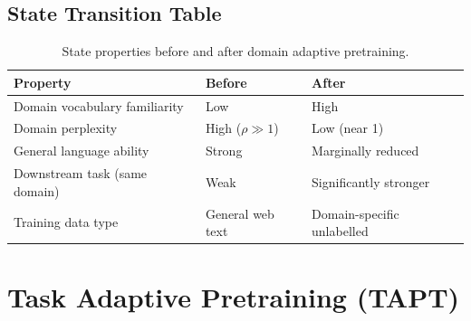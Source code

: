 \subsection{State Transition Table}
\begin{table}[h]\centering
\begin{tabular}{lll}\toprule
\textbf{Property} & \textbf{Before} & \textbf{After}\\\midrule
Domain vocabulary familiarity & Low & High\\
Domain perplexity & High ($\rho \gg 1$) & Low (near 1)\\
General language ability & Strong & Marginally reduced\\
Downstream task (same domain) & Weak & Significantly stronger\\
Training data type & General web text & Domain-specific unlabelled\\\bottomrule
\end{tabular}
\caption{State properties before and after domain adaptive pretraining.}
\end{table}

\newpage
\section{Task Adaptive Pretraining (TAPT)}


